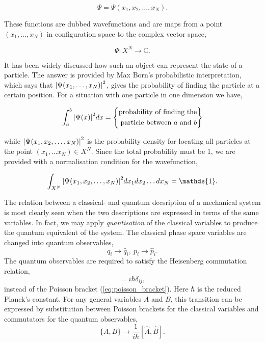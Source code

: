     \begin{equation}
        \Psi = \Psi(x_1, x_2, \dots, x_N).
    \end{equation}
    
    These functions
    are dubbed wavefunctions and are maps from a point $(x_1, \dots, x_N)$ in
    configuration space to the complex vector space,

    \begin{equation}
        \Psi: X^N \to \mathds{C}.
    \end{equation}

    It has been widely discussed how such an object can represent the state of a 
    particle. The answer is provided by Max Born's probabilistic interpretation,
    which says that $\abs{\Psi(x_1, \dots, x_N)}^2$, gives the probability of finding
    the particle at a certain position. For a situation with one particle in one
    dimension we have,

    \begin{equation}
        \int_a^b \abs{\Psi(x)}^2 dx = 
        \left\{\begin{aligned}
            \text{probability of finding the} \\
            \text{particle between $a$ and $b$}
        \end{aligned}\right\}
    \end{equation}

    while $\abs{\Psi(x_1, x_2, \dots, x_N)}^2$ is the probability density for locating
    all particles at the point $(x_1, \dots x_N) \in X^N$. Since the total probability
    must be 1, we are provided with a normalisation condition for the wavefunction,
    
    \begin{equation}
        \int_{X^N} \abs{\Psi(x_1, x_2, \dots, x_N)}^2 dx_1 dx_2\dots dx_N = \mathds{1}.
    \end{equation}

    The relation between a classical- and quantum decsription of a mechanical system 
    is most clearly seen when the two descriptions are expressed in terms of the same 
    variables. In fact, we may apply \emph{quantisation} of the classical variables to 
    produce the quantum equivalent of the system. The classical phase space variables 
    are changed into quantum observables,
    \begin{equation}
        q_i \to \hat{q}_i, \ p_i \to \hat{p}_i.
    \end{equation}
    The quantum observables are required to satisfy the Heisenberg commutation relation,
    \begin{equation}
        [\hat{q}_i, \hat{p}_j] = i \hbar \delta_{ij},
    \end{equation}
    instead of the Poisson bracket (\autoref{eq:poisson_bracket}). Here $\hbar$ is the 
    reduced Planck's constant. For any general variables $A$ and $B$, this 
    transition can be expressed by substitution between Poisson brackets for the 
    classical variables and commutators for the quantum observables,
    \begin{equation}
        \{A, B\} \to \frac{1}{i\hbar}[\hat{A},\hat{B}].
    \end{equation}

